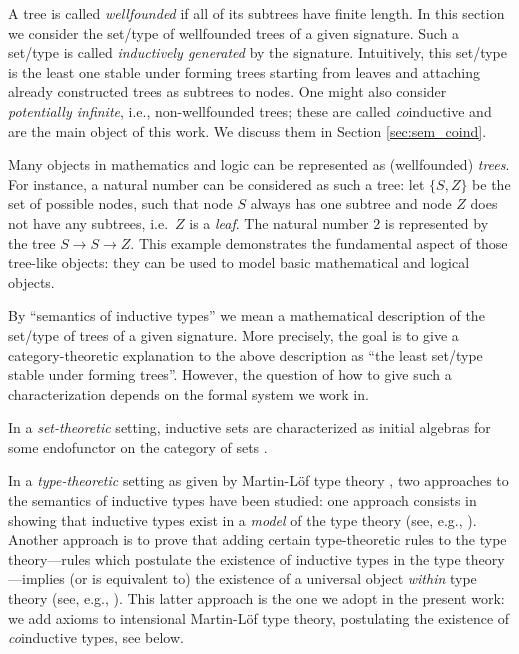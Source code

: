\documentclass[a4paper,USenglish]{lipics}
\newcommand{\parencite}[1]{\cite{#1}}
\begin{document}
 A tree is called \emph{wellfounded} if all of its subtrees have finite length. In this section we consider the set/type of wellfounded trees of 
 a given signature. Such a set/type is called \emph{inductively generated} by the signature. Intuitively, this set/type is the least one stable under
 forming trees starting from leaves and attaching already constructed trees as subtrees to nodes.
 One might also consider \emph{potentially infinite}, i.e., non-wellfounded trees; these are called \emph{co}inductive and are the main object of this work.
 We discuss them in Section \ref{sec:sem_coind}.
 
 
 Many objects in mathematics and logic can be represented as (wellfounded) \emph{trees}.
 For instance, a natural number can be considered as such a tree: let $\{S,Z\}$ be the set of possible nodes, 
 such that node $S$ always has one subtree and node $Z$ does not have any subtrees, i.e.\ $Z$ is a \emph{leaf}.
 The natural number $2$ is represented by the tree $S\longrightarrow S\longrightarrow Z$. 
 This example demonstrates the fundamental aspect of those tree-like objects: they can be used to model basic mathematical and logical objects.
 
  
 By \enquote{semantics of inductive types} we mean a mathematical description of the set/type of trees of a given signature. 
 More precisely, the goal is to give a category-theoretic explanation to the above description as \enquote{the least set/type stable under forming trees}.
 However, the question of how to give such a characterization depends on the formal system we work in. 
 
 In a \emph{set-theoretic} setting, inductive sets are characterized as initial algebras for 
 some endofunctor on the category of sets \parencite{jacobs1997tutorial}.
 
 In a \emph{type-theoretic} setting as given by Martin-L\"of type theory \parencite{martin_lof}, 
 two approaches to the semantics of inductive types have been studied: 
 one approach consists in showing that inductive types exist in a \emph{model} of the type theory
 (see, e.g., \cite{DBLP:journals/apal/MoerdijkP00}).
 Another approach is to prove that adding certain type-theoretic rules to the type theory---rules which postulate the existence
 of inductive types in the type theory---implies (or is equivalent to) the existence of a universal object \emph{within} type theory
 (see, e.g., \parencite{DBLP:journals/tcs/Dybjer97, DBLP:conf/lics/AwodeyGS12}).
 This latter approach is the one we adopt in the present work: we add axioms to intensional Martin-Löf type theory,
 postulating the existence of \emph{co}inductive types, see below.
 
\end{document}
